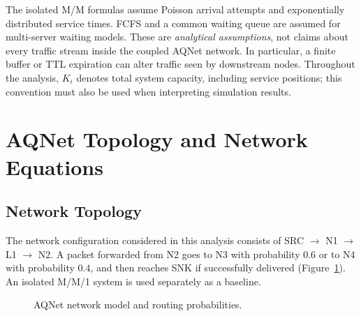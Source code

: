 The isolated M/M formulas assume Poisson arrival attempts and
exponentially distributed service times. FCFS and a common waiting
queue are assumed for multi-server waiting models. These are
\emph{analytical assumptions}, not claims about every traffic stream
inside the coupled AQNet network. In particular, a finite buffer or
TTL expiration can alter traffic seen by downstream nodes. Throughout the analysis, $K_i$ denotes total system capacity,
including service positions; this convention must also be used
when interpreting simulation results.

\section{AQNet Topology and Network Equations}
\label{sec:b2_aqnet}

\subsection{Network Topology}
The network configuration considered in this analysis consists of SRC $\to$ N1 $\to$ L1
$\to$ N2. A packet forwarded from N2 goes to N3 with probability
$0.6$ or to N4 with probability $0.4$, and then reaches SNK if
successfully delivered (Figure~\ref{fig:b2_aqnet}). An isolated
M/M/1 system is used separately as a baseline.

\begin{figure}[htbp]
\centering
{}
\caption{AQNet network model and routing probabilities.}
\label{fig:b2_aqnet}
\end{figure}

